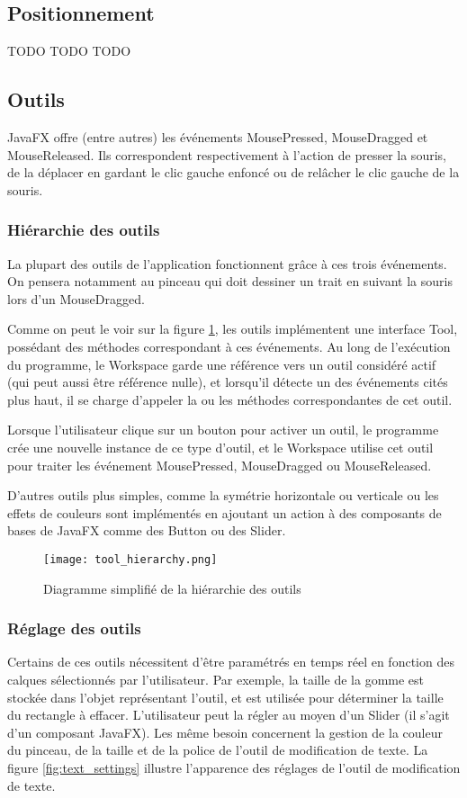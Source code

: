 \subsection{Positionnement}
TODO TODO TODO 

\subsection{Outils}
\par
JavaFX offre (entre autres) les événements MousePressed, MouseDragged et MouseReleased. Ils correspondent respectivement à l'action de presser la souris, de la déplacer en gardant le clic gauche enfoncé ou de relâcher le clic gauche de la souris. 
\subsubsection{Hiérarchie des outils}
\par
La plupart des outils de l'application  fonctionnent grâce à ces trois événements. On pensera notamment au pinceau qui doit dessiner un trait en suivant la souris lors d'un MouseDragged. 
\par
Comme on peut le voir sur la figure \ref{fig:tool_hier}, les outils implémentent une interface Tool, possédant des méthodes correspondant à ces événements. Au long de l'exécution du programme, le Workspace garde une référence vers un outil considéré actif (qui peut aussi être référence nulle), et lorsqu'il détecte un des événements cités plus haut, il se charge d'appeler la ou les méthodes correspondantes de cet outil.
\par
Lorsque l'utilisateur clique sur un bouton pour activer un outil, le programme crée une nouvelle instance de ce type d'outil, et le Workspace utilise cet outil pour traiter les événement MousePressed, MouseDragged ou MouseReleased.
\par
D'autres outils plus simples, comme la symétrie horizontale ou verticale ou les effets de couleurs sont implémentés en ajoutant un action à des composants de bases de JavaFX comme des Button ou des Slider.
	
\begin{figure}[H]
	\caption{Diagramme simplifié de la hiérarchie des outils}
	\centering
	\texttt{[image: tool\_hierarchy.png]}
	\label{fig:tool_hier}
\end{figure}

\subsubsection{Réglage des outils} \label{reglage-outils}
Certains de ces outils nécessitent d'être paramétrés en temps réel en fonction des calques sélectionnés par l'utilisateur. Par exemple, la taille de la gomme est stockée dans l'objet représentant l'outil, et est utilisée pour déterminer la taille du rectangle à effacer. L'utilisateur peut la régler au moyen d'un Slider (il s'agit d'un composant JavaFX). Les même besoin concernent la gestion de la couleur du pinceau, de la taille et de la police de l'outil de modification de texte. La figure \ref{fig:text_settings} illustre l'apparence des réglages de l'outil de modification de texte.

